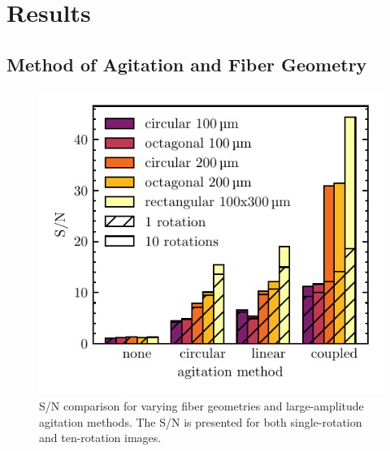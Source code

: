 \documentclass[twocolumn]{emulateapj}
\begin{document}
\section{Results}
\label{sec:results}

\subsection{Method of Agitation and Fiber Geometry}
\label{subsec:ag_snr}

\begin{figure}
\centering
	\includegraphics[width=\columnwidth]{images/ag_snr.pdf}
	\caption{S/N comparison for varying fiber geometries and large-amplitude agitation methods. The S/N is presented for both single-rotation and ten-rotation images.}
\label{fig:ag_snr}
\end{figure}
\end{document}
